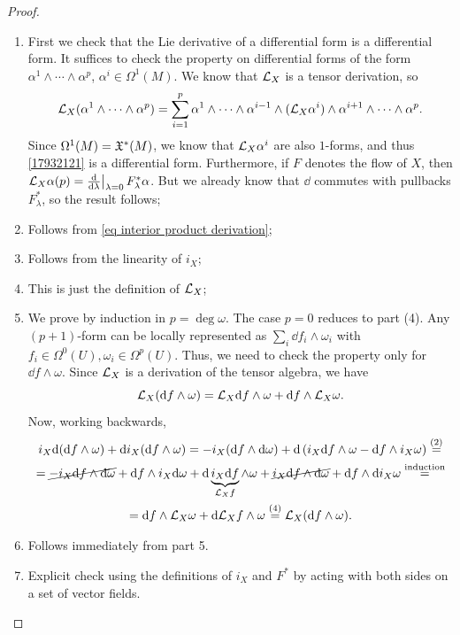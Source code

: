\begin{proof}
\begin{enumerate}
    \item First we check that the Lie derivative of a differential form is a differential form. It suffices to check the property on differential forms of the form $\alpha^1\wedge\cdots\wedge\alpha^p$, $\alpha^i\in\Omega^1(M)$. We know that $\mathcal{L}_X$ is a tensor derivation, so 
    \[\mathcal{L}_X (\alpha^1\wedge\cdots\wedge\alpha^p)=\sum_{i=1}^p \alpha^1\wedge\cdots\wedge\alpha^{i-1}\wedge(\mathcal{L}_X\alpha^i)\wedge\alpha^{i+1}\wedge\cdots\wedge\alpha^p.\label{17932121}\]
    Since $\Omega^1(M)=\mathfrak{X}^\ast(M)$, we know that $\mathcal{L}_X \alpha^i$ are also $1$-forms, and thus \eqref{17932121} is a differential form.
    Furthermore, if $F$ denotes the flow of $X$, then $\Lie_X\alpha (p)=\restr{\frac{\dd}{\dd\lambda}}{\lambda=0}F^\ast_\lambda \alpha$. But we already know that $\dd$ commutes with pullbacks $F^\ast_\lambda$, so the result follows;
    \item Follows from \eqref{eq interior product derivation};
    \item Follows from the linearity of $i_X$;
    \item This is just the definition of $\mathcal{L}_X$;
    \item We prove by induction in $p=\deg\omega$. The case $p=0$ reduces to part (4). Any $(p+1)$-form can be locally represented as $\sum_i \dd f_i\wedge \omega_i$ with $f_i\in\Omega^0(U), \omega_i\in \Omega^p(U)$. Thus, we need to check the property only for $\dd f\wedge \omega$. Since $\mathcal{L}_X$ is a derivation of the tensor algebra, we have
    \[\mathcal{L}_X({\mathrm{d}} f\wedge\omega)=\mathcal{L}_X {\mathrm{d}} f\wedge \omega+{\mathrm{d}} f\wedge \mathcal{L}_X\omega.\]
    Now, working backwards,
    \begin{multline}
        i_X{\mathrm{d}} ({\mathrm{d}} f\wedge \omega)+ {\mathrm{d}} i_X ({\mathrm{d}} f\wedge\omega)=-i_X({\mathrm{d}} f\wedge{\mathrm{d}} \omega)+{\mathrm{d}}\left(i_X{\mathrm{d}} f\wedge\omega-{\mathrm{d}} f\wedge i_X\omega\right)\overset{(2)}{=}
        \\
        =\cancel{-i_X{\mathrm{d}} f\wedge{\mathrm{d}} \omega}+{\mathrm{d}} f\wedge i_X{\mathrm{d}}\omega +{\mathrm{d}} \underbrace{i_X {\mathrm{d}} f}_{\mathcal{L}_X f}\wedge\omega+\cancel{i_X{\mathrm{d}} f\wedge{\mathrm{d}} \omega}+{\mathrm{d}} f\wedge {\mathrm{d}} i_X\omega\overset{\text{induction}}{=}
        \\
        ={\mathrm{d}} f\wedge \mathcal{L}_X\omega +{\mathrm{d}} \mathcal{L}_X f\wedge \omega\overset{(4)}{=}\mathcal{L}_X({\mathrm{d}} f\wedge\omega).
    \end{multline}
    \item Follows immediately from part 5.
    \item Explicit check using the definitions of $i_X$ and $F^\ast$ by acting with both sides on a set of vector fields.
\end{enumerate}
\end{proof}

